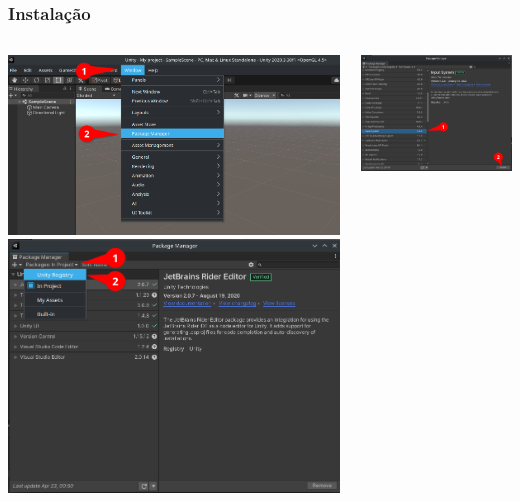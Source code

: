 \documentclass{beamer}
\begin{document}
	\begin{frame}
		\frametitle{Instalação}

		\begin{columns}
			\includegraphics[width=\textwidth]{input-install-1}
			\includegraphics[width=\textwidth]{input-install-2}

			\includegraphics[width=\textwidth]{input-install-3}
		\end{columns}
	\end{frame}
\end{document}
